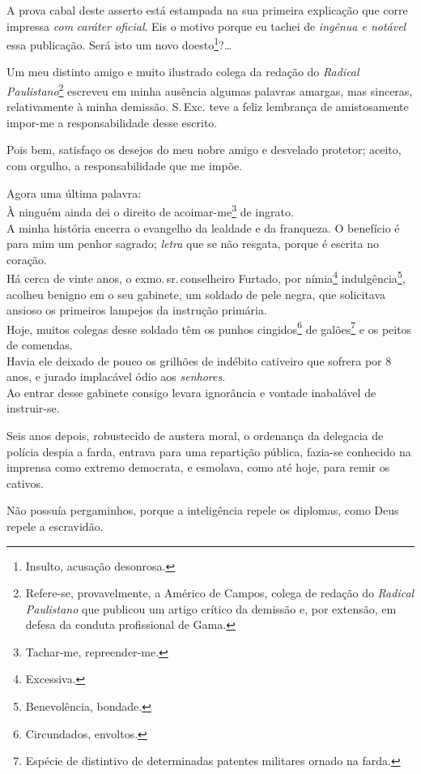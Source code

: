 A prova cabal deste asserto está estampada na sua primeira explicação
que corre impressa \emph{com} \emph{caráter oficial}. Eis o motivo
porque eu tachei de \emph{ingênua e notável} essa publicação. Será isto
um novo doesto\footnote{Insulto, acusação desonrosa.}?\ldots{}

Um meu distinto amigo e muito ilustrado colega da redação do
\emph{Radical Paulistano}\footnote{Refere-se, provavelmente, a Américo
  de Campos, colega de redação do \emph{Radical Paulistano} que publicou
  um artigo crítico da demissão e, por extensão, em defesa da conduta
  profissional de Gama.} escreveu em minha ausência algumas palavras
amargas, mas sinceras, relativamente à minha demissão. S.\,Exc. teve a
feliz lembrança de amistosamente impor-me a responsabilidade desse
escrito.

Pois bem, satisfaço os desejos do meu nobre amigo e desvelado protetor;
aceito, com orgulho, a responsabilidade que me impõe.

Agora uma última palavra:\\
À ninguém ainda dei o direito de acoimar-me\footnote{Tachar-me,
  repreender-me.} de ingrato.\\
A minha história encerra o evangelho da lealdade e da franqueza. O
benefício é para mim um penhor sagrado; \emph{letra} que se não resgata,
porque é escrita no coração.\\
Há cerca de vinte anos, o exmo.\,sr.\,conselheiro Furtado, por
nímia\footnote{Excessiva.} indulgência\footnote{Benevolência,
  bondade.}, acolheu benigno em o seu gabinete, um soldado de pele
negra, que solicitava ansioso os primeiros lampejos da instrução
primária.\\
Hoje, muitos colegas desse soldado têm os punhos cingidos\footnote{
  Circundados, envoltos.} de galões\footnote{Espécie de distintivo de
  determinadas patentes militares ornado na farda.} e os peitos de
comendas.\\
Havia ele deixado de pouco os grilhões de indébito cativeiro que sofrera
por 8 anos, e jurado implacável ódio aos \emph{senhores}.\\
Ao entrar desse gabinete consigo levara ignorância e vontade inabalável
de instruir-se.

Seis anos depois, robustecido de austera moral, o ordenança da delegacia
de polícia despia a farda, entrava para uma repartição pública, fazia-se
conhecido na imprensa como extremo democrata, e esmolava, como até hoje,
para remir os cativos.

Não possuía pergaminhos, porque a inteligência repele os diplomas, como
Deus repele a escravidão.

